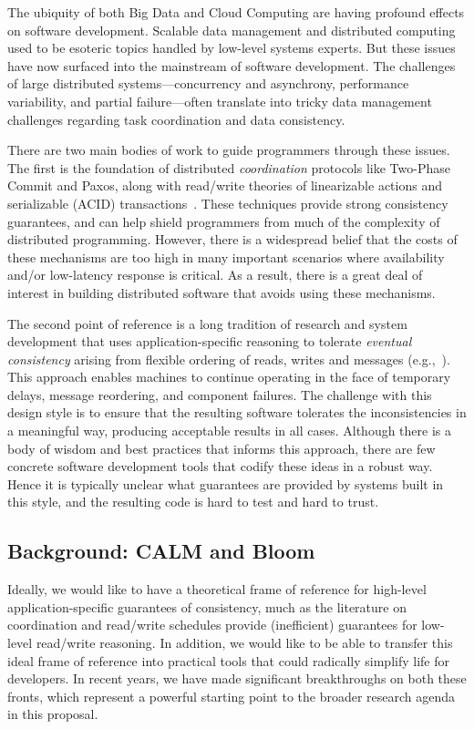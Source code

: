 The ubiquity of both Big Data and Cloud Computing are having profound effects on software development. Scalable data management and distributed computing used to be esoteric topics handled by low-level systems experts.  But these issues have now surfaced into the mainstream of software development.   The challenges of large distributed systems---concurrency and asynchrony, performance variability, and partial failure---often translate into tricky data management challenges regarding task coordination and data consistency.

There are two main bodies of work to guide programmers through these issues.  The first is the foundation of distributed \emph{coordination} protocols like Two-Phase Commit and Paxos, along with read/write theories of linearizable actions and serializable (ACID) transactions~\cite{distributedbook,grayreuter}. These techniques provide strong consistency guarantees, and can help shield programmers from much of the complexity of distributed programming. However, there is a widespread belief that the costs of these mechanisms are too high in many important scenarios where availability and/or low-latency response is critical.
As a result, there is a great deal of interest in building distributed software that avoids using these mechanisms.

The second point of reference is a long tradition of research and system development that uses application-specific reasoning to tolerate \emph{eventual consistency} arising from flexible ordering of reads, writes and messages (e.g.,~\cite{dynamo,sagas,beyond,quicksand,base,Shapiro2011b,bayou}). This approach enables machines to continue operating in the face of temporary delays, message reordering, and component failures.  
The challenge with this design style is to ensure that the resulting software tolerates the inconsistencies in a meaningful way, producing acceptable results in all cases.  Although there is a body of wisdom and best practices that informs this approach, there are few concrete software development tools that codify these ideas in a robust way.  Hence it is typically unclear what guarantees are provided by systems built in this style, and the resulting code is hard to test and hard to trust.  

\subsection{Background: CALM and Bloom}
Ideally, we would like to have a theoretical frame of reference for high-level application-specific guarantees of consistency, much as the literature on coordination and read/write schedules provide (inefficient) guarantees for low-level read/write reasoning. In addition, we would like to be able to transfer this ideal frame of reference into practical tools that could radically simplify life for developers.  In recent years, we have made significant breakthroughs on both these fronts, which represent a powerful starting point to the broader research agenda in this proposal.

